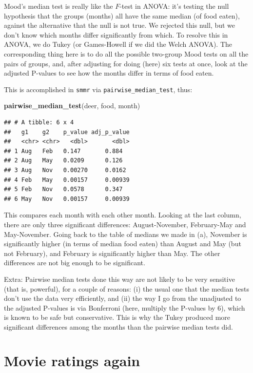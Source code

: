 \documentclass[]{tufte-book}
\newenvironment{Shaded}{}{}
\newcommand{\KeywordTok}[1]{\textcolor[rgb]{0.00,0.44,0.13}{\textbf{#1}}}
\newcommand{\NormalTok}[1]{#1}
\theoremstyle{definition}
\theoremstyle{definition}
\theoremstyle{definition}
\theoremstyle{remark}
\begin{document}
Mood's median test is really like the \(F\)-test in ANOVA: it's testing
the null hypothesis that the groups (months) all have the same median
(of food eaten), against the alternative that the null is not true. We
rejected this null, but we don't know which months differ significantly
from which. To resolve this in ANOVA, we do Tukey (or Games-Howell if we
did the Welch ANOVA). The corresponding thing here is to do all the
possible two-group Mood tests on all the pairs of groups, and, after
adjusting for doing (here) six tests at once, look at the adjusted
P-values to see how the months differ in terms of food eaten.

This is accomplished in \texttt{smmr} via
\texttt{pairwise\_median\_test}, thus:

\begin{Shaded}
\begin{Highlighting}[]
\KeywordTok{pairwise_median_test}\NormalTok{(deer, food, month)}
\end{Highlighting}
\end{Shaded}

\begin{verbatim}
## # A tibble: 6 x 4
##   g1    g2    p_value adj_p_value
##   <chr> <chr>   <dbl>       <dbl>
## 1 Aug   Feb   0.147       0.884  
## 2 Aug   May   0.0209      0.126  
## 3 Aug   Nov   0.00270     0.0162 
## 4 Feb   May   0.00157     0.00939
## 5 Feb   Nov   0.0578      0.347  
## 6 May   Nov   0.00157     0.00939
\end{verbatim}

This compares each month with each other month. Looking at the last
column, there are only three significant differences: August-November,
February-May and May-November. Going back to the table of medians we
made in (a), November is significantly higher (in terms of median food
eaten) than August and May (but not February), and February is
significantly higher than May. The other differences are not big enough
to be significant.

Extra: Pairwise median tests done this way are not likely to be very
sensitive (that is, powerful), for a couple of reasons: (i) the usual
one that the median tests don't use the data very efficiently, and (ii)
the way I go from the unadjusted to the adjusted P-values is via
Bonferroni (here, multiply the P-values by 6), which is known to be safe
but conservative. This is why the Tukey produced more significant
differences among the months than the pairwise median tests did.

\hypertarget{movie-ratings-again}{%
\section{Movie ratings again}\label{movie-ratings-again}}
\end{document}
